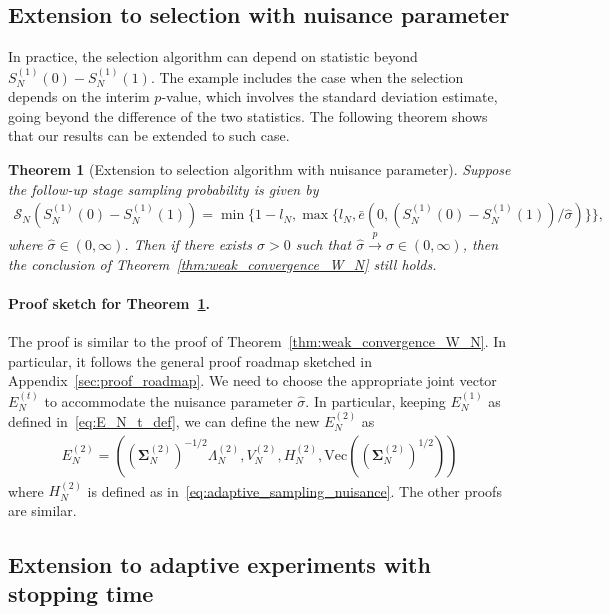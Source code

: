 \documentclass[12pt]{article}
\newtheorem{theorem}{Theorem}
\newcommand{\convp}{\overset p \rightarrow}             %
\begin{document}
\subsection{Extension to selection with nuisance parameter}\label{sec:extension_nuisance}

In practice, the selection algorithm can depend on statistic beyond $S_{N}^{(1)}(0)-S_{N}^{(1)}(1)$. The example includes the case when the selection depends on the interim $p$-value, which involves the standard deviation estimate, going beyond the difference of the two statistics. The following theorem shows that our results can be extended to such case.

\begin{theorem}[Extension to selection algorithm with nuisance parameter]\label{thm:weak_convergence_W_N_nuisance}
	Suppose the follow-up stage sampling probability is given by
	\begin{align}\label{eq:adaptive_sampling_nuisance}
		\mathcal{S}_N(S_N^{(1)}(0)-S_N^{(1)}(1))=\min\{1-l_N,\max\{l_N, \bar e(0, (S_N^{(1)}(0)-S_N^{(1)}(1))/\hat\sigma)\}\},
	\end{align}
	where $\hat\sigma\in(0,\infty)$. Then if there exists $\sigma>0$ such that $\hat\sigma\convp \sigma\in(0,\infty)$, then the conclusion of Theorem~\ref{thm:weak_convergence_W_N} still holds.
\end{theorem}
\paragraph{Proof sketch for Theorem~\ref{thm:weak_convergence_W_N_nuisance}.}
The proof is similar to the proof of Theorem~\ref{thm:weak_convergence_W_N}. In particular, it follows the general proof roadmap sketched in Appendix~\ref{sec:proof_roadmap}. We need to choose the appropriate joint vector $E_N^{(t)}$ to accommodate the nuisance parameter $\hat\sigma$. In particular, keeping $E_N^{(1)}$ as defined in~\eqref{eq:E_N_t_def}, we can define the new $E_N^{(2)}$ as
\begin{align*}
	E_N^{(2)}=\left((\bm \Sigma_N^{(2)})^{-1/2}\Lambda_{N}^{(2)}, V_N^{(2)},H_N^{(2)},\mathrm{Vec}((\bm \Sigma_N^{(2)})^{1/2})\right)
\end{align*}
where $H_N^{(2)}$ is defined as in~\eqref{eq:adaptive_sampling_nuisance}. The other proofs are similar.


\subsection{Extension to adaptive experiments with stopping time}\label{sec:extension_stopping_time}
\end{document}
